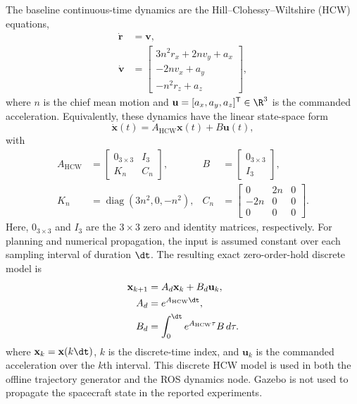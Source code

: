 The baseline continuous-time dynamics are the Hill--Clohessy--Wiltshire (HCW)
equations,
\begin{align}
  \dot{\mathbf r} &= \mathbf v, \\
  \dot{\mathbf v} &=
  \begin{bmatrix}
    3n^2 r_x + 2n v_y + a_x \\
    -2n v_x + a_y \\
    -n^2 r_z + a_z
  \end{bmatrix},
\end{align}
where $n$ is the chief mean motion and
$\mathbf{u}=[a_x,a_y,a_z]^{\mathsf{T}}\in\R^3$ is the commanded acceleration.
Equivalently, these dynamics have the linear state-space form
\begin{equation}
  \dot{\mathbf{x}}(t)
  = A_{\mathrm{HCW}}\mathbf{x}(t)+B\mathbf{u}(t),
  \label{eq:hcw-continuous}
\end{equation}
with
\begin{align}
  A_{\mathrm{HCW}} & =
  \begin{bmatrix}
    0_{3\times3} & I_3 \\
    K_n & C_n
  \end{bmatrix},
  & B & =
  \begin{bmatrix}
    0_{3\times3} \\ I_3
  \end{bmatrix}, \\
  K_n & = \operatorname{diag}(3n^2,0,-n^2),
  & C_n & =
  \begin{bmatrix}
    0 & 2n & 0 \\
    -2n & 0 & 0 \\
    0 & 0 & 0
  \end{bmatrix}.
\end{align}
Here, $0_{3\times3}$ and $I_3$ are the $3\times3$ zero and identity matrices,
respectively. For planning and numerical propagation, the input is assumed
constant over each sampling interval of duration $\dt$. The resulting exact
zero-order-hold discrete model is
\begin{align}
  \mathbf{x}_{k+1} &= A_d\mathbf{x}_k+B_d\mathbf{u}_k,
  \label{eq:hcw-discrete}\\
  A_d &= e^{A_{\mathrm{HCW}}\dt},\\
  B_d &= \int_0^{\dt}e^{A_{\mathrm{HCW}}\tau}B\,d\tau.
\end{align}
where $\mathbf{x}_k=\mathbf{x}(k\dt)$, $k$ is the discrete-time index, and
$\mathbf{u}_k$ is the commanded acceleration over the $k$th interval. This
discrete HCW model is used in both the offline trajectory generator and the
ROS dynamics node. Gazebo is not used to propagate the spacecraft state in
the reported experiments.


